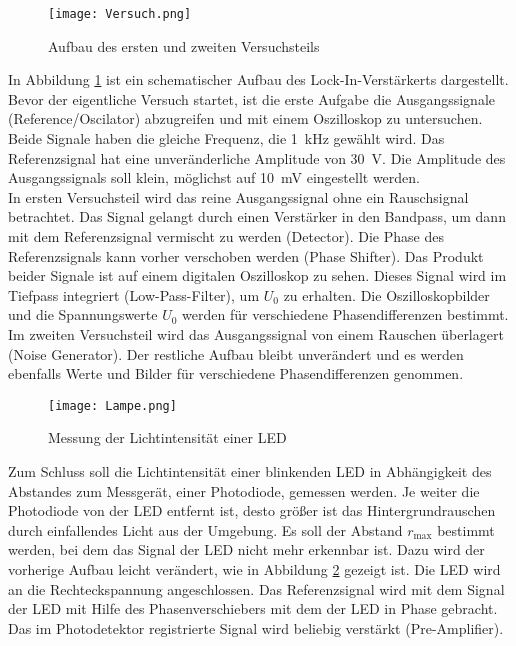 \begin{figure}[h!] 
	\texttt{[image: Versuch.png]}
\caption[Aufbau des ersten und zweiten versuchteils]{Aufbau des ersten und zweiten Versuchsteils \footnotemark}
	\label{versuch}
\end{figure}	

In Abbildung \ref{versuch} ist ein schematischer Aufbau des Lock-In-Verstärkerts dargestellt.  \\
Bevor der eigentliche Versuch startet, ist die erste Aufgabe die Ausgangssignale (Reference/Oscilator) abzugreifen und mit einem Oszilloskop zu untersuchen. Beide Signale haben die gleiche Frequenz, die  \SI{1}{\kilo\hertz} gewählt wird. Das Referenzsignal hat eine unveränderliche Amplitude von \SI{30}{\volt}. Die Amplitude des Ausgangssignals soll klein, möglichst auf \SI{10}{\milli\volt} eingestellt werden. \\
In ersten Versuchsteil wird das reine Ausgangssignal ohne ein Rauschsignal betrachtet. Das Signal gelangt durch einen Verstärker in den Bandpass, um dann mit dem Referenzsignal vermischt zu werden (Detector). Die Phase des Referenzsignals kann vorher verschoben werden (Phase Shifter). Das Produkt beider Signale ist auf einem digitalen Oszilloskop zu sehen. Dieses Signal wird im Tiefpass integriert (Low-Pass-Filter), um $U_0$ zu erhalten. Die Oszilloskopbilder und die Spannungswerte $U_0$ werden für verschiedene Phasendifferenzen bestimmt. \\
Im zweiten Versuchsteil wird das Ausgangssignal von einem Rauschen überlagert (Noise Generator). Der restliche Aufbau bleibt unverändert und es werden ebenfalls Werte und Bilder für verschiedene Phasendifferenzen genommen. \\
\begin{figure}[h!]
	\texttt{[image: Lampe.png]}
	\caption{Messung der Lichtintensität einer LED\protect\footnotemark}
	\label{lampe}
\end{figure}	
	
Zum Schluss soll die Lichtintensität einer blinkenden LED in Abhängigkeit des Abstandes zum Messgerät, einer Photodiode, gemessen werden. Je weiter die Photodiode von der LED entfernt ist, desto größer ist das Hintergrundrauschen durch einfallendes Licht aus der Umgebung. Es soll der Abstand $r_\text{max}$ bestimmt werden, bei dem das Signal der LED nicht mehr erkennbar ist. Dazu wird der vorherige Aufbau leicht verändert, wie in Abbildung \ref{lampe} gezeigt ist. Die LED wird an die Rechteckspannung angeschlossen. Das Referenzsignal wird mit dem Signal der LED mit Hilfe des Phasenverschiebers  mit dem der LED in Phase gebracht. Das im Photodetektor registrierte Signal wird beliebig verstärkt (Pre-Amplifier).
